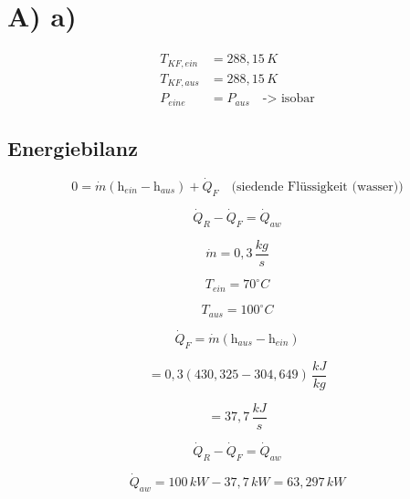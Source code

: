 \section*{A) a)}

\begin{align*}
T_{KF,ein} &= 288,15 \, K \\
T_{KF,aus} &= 288,15 \, K \\
P_{eine} &= P_{aus} \quad \text{-> isobar}
\end{align*}

\subsection*{Energiebilanz}

\[
0 = \dot{m} (\text{h}_{ein} - \text{h}_{aus}) + \dot{Q}_F \quad \text{(siedende Flüssigkeit (wasser))}
\]

\[
\dot{Q}_R - \dot{Q}_F = \dot{Q}_{aw}
\]

\[
\dot{m} = 0,3 \, \frac{kg}{s}
\]

\[
T_{ein} = 70^\circ C
\]

\[
T_{aus} = 100^\circ C
\]

\[
\dot{Q}_F = \dot{m} (\text{h}_{aus} - \text{h}_{ein})
\]

\[
= 0,3 (430,325 - 304,649) \, \frac{kJ}{kg}
\]

\[
= 37,7 \, \frac{kJ}{s}
\]

\[
\dot{Q}_R - \dot{Q}_F = \dot{Q}_{aw}
\]

\[
\dot{Q}_{aw} = 100 \, kW - 37,7 \, kW = 63,297 \, kW
\]